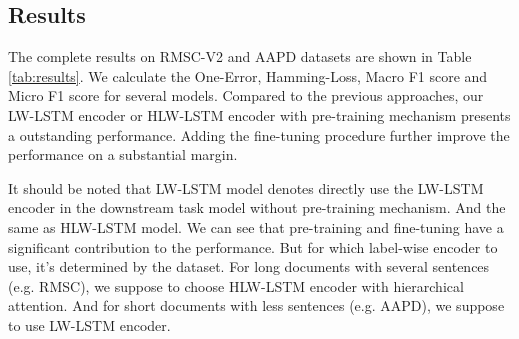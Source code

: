 \documentclass[runningheads]{llncs}
\begin{document}
\subsection{Results}
The complete results on RMSC-V2 and AAPD datasets are shown in Table \ref{tab:results}. We calculate the One-Error, Hamming-Loss, Macro F1 score and Micro F1 score for several models. Compared to the previous approaches, our LW-LSTM encoder or HLW-LSTM encoder with pre-training mechanism presents a outstanding performance. Adding the fine-tuning procedure further improve the performance on a substantial margin.

It should be noted that LW-LSTM model denotes directly use the LW-LSTM encoder in the downstream task model without pre-training mechanism. And the same as HLW-LSTM model. We can see that pre-training and fine-tuning have a significant contribution to the performance. But for which label-wise encoder to use, it's determined by the dataset. For long documents with several sentences (e.g. RMSC), we suppose to choose HLW-LSTM encoder with hierarchical attention. And for short documents with less sentences (e.g. AAPD), we suppose to use LW-LSTM encoder. 
\end{document}
